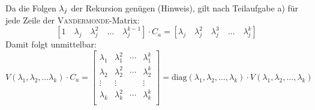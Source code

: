 \begin{flushalphb}
\item
	Da die Folgen ${\bf \lambda}_j$ der Rekursion genügen (Hinweis), gilt nach Teilaufgabe a) für jede Zeile der \textsc{Vandermonde}-Matrix:
	\[ \left[ 1 \quad \lambda_j \quad \lambda_j^2 \quad \ldots \quad \lambda_j^{k-1} \right] \cdot C_a =
	   \left[ \lambda_j \quad \lambda_j^2 \quad \lambda_j^3 \quad \ldots \quad \lambda_j^k\right] \]
	Damit folgt unmittelbar:
	\[ V(\lambda_1, \lambda_2, \ldots \lambda_k) \cdot C_a = 
		\begin{bmatrix}
			\lambda_1 & \lambda_1^2 & \cdots & \lambda_1^k \\
			\lambda_2 & \lambda_2^2 & \cdots & \lambda_2^k \\
			\vdots    & \vdots      &        & \vdots      \\
			\lambda_k & \lambda_k^2 & \cdots & \lambda_k^k \\
		\end{bmatrix} = \text{diag}(\lambda_1, \lambda_2, \ldots, \lambda_k) \cdot V(\lambda_1, \lambda_2, ..., \lambda_k) \]
\end{flushalphb}
